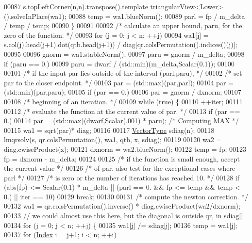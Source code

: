 \begin{DoxyCode}
00087       s.topLeftCorner(n,n).transpose().template triangularView<Lower>().solveInPlace(wa1);
00088       temp = wa1.blueNorm();
00089       parl = fp / m\_delta / temp / temp;
00090     \}
00091 
00092     \textcolor{comment}{/* calculate an upper bound, paru, for the zero of the function. */}
00093     \textcolor{keywordflow}{for} (j = 0; j < n; ++j)
00094       wa1[j] = s.col(j).head(j+1).dot(qtb.head(j+1)) / diag[qr.colsPermutation().indices()(j)];
00095 
00096     gnorm = wa1.stableNorm();
00097     paru = gnorm / m\_delta;
00098     \textcolor{keywordflow}{if} (paru == 0.)
00099       paru = dwarf / (std::min)(m\_delta,Scalar(0.1));
00100 
00101     \textcolor{comment}{/* if the input par lies outside of the interval (parl,paru), */}
00102     \textcolor{comment}{/* set par to the closer endpoint. */}
00103     par = (std::max)(par,parl);
00104     par = (std::min)(par,paru);
00105     \textcolor{keywordflow}{if} (par == 0.)
00106       par = gnorm / dxnorm;
00107 
00108     \textcolor{comment}{/* beginning of an iteration. */}
00109     \textcolor{keywordflow}{while} (\textcolor{keyword}{true}) \{
00110       ++iter;
00111 
00112       \textcolor{comment}{/* evaluate the function at the current value of par. */}
00113       \textcolor{keywordflow}{if} (par == 0.)
00114         par = (std::max)(dwarf,Scalar(.001) * paru); \textcolor{comment}{/* Computing MAX */}
00115       wa1 = sqrt(par)* diag;
00116 
00117       \hyperlink{struct_vector_type}{VectorType} sdiag(n);
00118       lmqrsolv(s, qr.colsPermutation(), wa1, qtb, x, sdiag);
00119 
00120       wa2 = diag.cwiseProduct(x);
00121       dxnorm = wa2.blueNorm();
00122       temp = fp;
00123       fp = dxnorm - m\_delta;
00124 
00125       \textcolor{comment}{/* if the function is small enough, accept the current value */}
00126       \textcolor{comment}{/* of par. also test for the exceptional cases where parl */}
00127       \textcolor{comment}{/* is zero or the number of iterations has reached 10. */}
00128       \textcolor{keywordflow}{if} (abs(fp) <= Scalar(0.1) * m\_delta || (parl == 0. && fp <= temp && temp < 0.) || iter == 10)
00129         \textcolor{keywordflow}{break};
00130 
00131       \textcolor{comment}{/* compute the newton correction. */}
00132       wa1 = qr.colsPermutation().inverse() * diag.cwiseProduct(wa2/dxnorm);
00133       \textcolor{comment}{// we could almost use this here, but the diagonal is outside qr, in sdiag[]}
00134       \textcolor{keywordflow}{for} (j = 0; j < n; ++j) \{
00135         wa1[j] /= sdiag[j];
00136         temp = wa1[j];
00137         \textcolor{keywordflow}{for} (\hyperlink{namespace_eigen_a62e77e0933482dafde8fe197d9a2cfde}{Index} i = j+1; i < n; ++i)

\end{DoxyCode}
